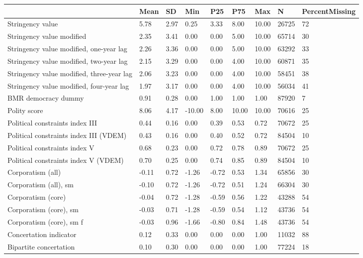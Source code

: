 
\begin{longtable}{lllllllll}
\toprule
  & Mean & SD & Min & P25 & P75 & Max & N & PercentMissing\\
\midrule
Stringency value & 5.78 & 2.97 & 0.25 & 3.33 & 8.00 & 10.00 & 26725 & 72\\
Stringency value modified & 2.35 & 3.41 & 0.00 & 0.00 & 5.00 & 10.00 & 65714 & 30\\
Stringency value modified, one-year lag & 2.26 & 3.36 & 0.00 & 0.00 & 5.00 & 10.00 & 63292 & 33\\
Stringency value modified, two-year lag & 2.15 & 3.29 & 0.00 & 0.00 & 4.00 & 10.00 & 60871 & 35\\
Stringency value modified, three-year lag & 2.06 & 3.23 & 0.00 & 0.00 & 4.00 & 10.00 & 58451 & 38\\
\addlinespace
Stringency value modified, four-year lag & 1.97 & 3.17 & 0.00 & 0.00 & 4.00 & 10.00 & 56034 & 41\\
BMR democracy dummy & 0.91 & 0.28 & 0.00 & 1.00 & 1.00 & 1.00 & 87920 & 7\\
Polity score & 8.06 & 4.17 & -10.00 & 8.00 & 10.00 & 10.00 & 70616 & 25\\
Political constraints index III & 0.44 & 0.16 & 0.00 & 0.39 & 0.53 & 0.72 & 70672 & 25\\
Political constraints index III (VDEM) & 0.43 & 0.16 & 0.00 & 0.40 & 0.52 & 0.72 & 84504 & 10\\
\addlinespace
Political constraints index V & 0.68 & 0.23 & 0.00 & 0.72 & 0.78 & 0.89 & 70672 & 25\\
Political constraints index V (VDEM) & 0.70 & 0.25 & 0.00 & 0.74 & 0.85 & 0.89 & 84504 & 10\\
Corporatism (all) & -0.11 & 0.72 & -1.26 & -0.72 & 0.53 & 1.34 & 65856 & 30\\
Corporatism (all), sm & -0.10 & 0.72 & -1.26 & -0.72 & 0.51 & 1.24 & 66304 & 30\\
Corporatism (core) & -0.04 & 0.72 & -1.28 & -0.59 & 0.56 & 1.22 & 43288 & 54\\
\addlinespace
Corporatism (core), sm & -0.03 & 0.71 & -1.28 & -0.59 & 0.54 & 1.12 & 43736 & 54\\
Corporatism (core), sm f & -0.03 & 0.96 & -1.66 & -0.80 & 0.84 & 1.48 & 43736 & 54\\
Concertation indicator & 0.12 & 0.33 & 0.00 & 0.00 & 0.00 & 1.00 & 11032 & 88\\
Bipartite concertation & 0.10 & 0.30 & 0.00 & 0.00 & 0.00 & 1.00 & 77224 & 18\\

\end{longtable}
